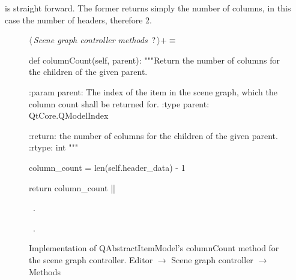 \documentclass[%
    a4paper,    %
    justified,  %
    nobib,      %
    openany     %
]{tufte-book}
\makeatletter
\renewcommand{\label}[1]{\@tufte@label{##1}}%
\makeatother
\begin{document}
 is straight
forward. The former returns simply the number of columns, in this case the
number of headers, therefore 2.

\begin{figure}
\begin{flushleft} \small
\begin{minipage}{\linewidth}\label{scrap33}\raggedright\small
{} $\langle\,${\itshape Scene graph controller methods}\nobreak\ {\footnotesize {?}}$\,\rangle+\equiv$
\vspace{-1ex}
\begin{pythoncode}
def columnCount(self, parent):
    """Return the number of columns for the children of the given
    parent.

    :param parent: The index of the item in the scene graph, which
                   the column count shall be returned for.
    :type  parent: QtCore.QModelIndex

    :return: the number of columns for the children of the given
             parent.
    :rtype:  int
    """

    column_count = len(self.header_data) - 1

    return column_count
|\NWsep|
\end{pythoncode}
\vspace{1.5ex}
\footnotesize
\begin{list}{}{\setlength{\itemsep}{-\parsep}\setlength{\itemindent}{-\leftmargin}}
\item \NWtxtMacroDefBy\ .
\item \NWtxtMacroRefIn\ .

\item{}
\end{list}
\end{minipage}\vspace{4ex}
\end{flushleft}
\caption{Implementation of QAbstractItemModel's columnCount method for the scene
  graph controller.
  \newline{}\newline{}Editor $\rightarrow$ Scene graph controller $\rightarrow$
  Methods}
\label{editor:lst:scene-graph-controller:methods:column-count}
\end{figure}
\end{document}
